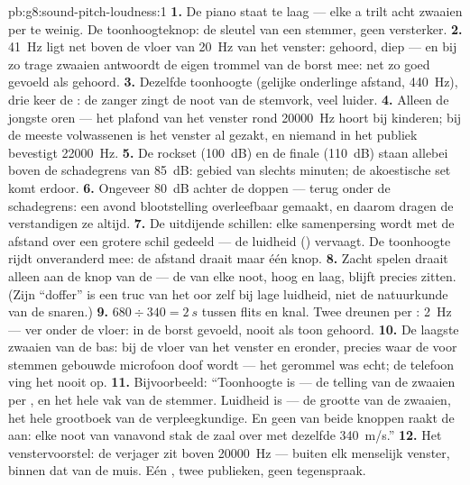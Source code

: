 \begin{solution}{pb:g8:sound-pitch-loudness:1}
\textbf{1.} De piano staat te laag --- elke a trilt acht zwaaien per
 te weinig. De toonhoogteknop: de sleutel van een stemmer, geen
versterker.
\textbf{2.} \qty{41}{Hz} ligt net boven de vloer van \qty{20}{Hz} van
het venster: gehoord, diep --- en bij zo trage zwaaien antwoordt de
eigen trommel van de borst mee: net zo goed gevoeld als gehoord.
\textbf{3.} Dezelfde toonhoogte (gelijke onderlinge afstand,
\qty{440}{Hz}), drie keer de : de zanger zingt de noot
van de stemvork, veel luider.
\textbf{4.} Alleen de jongste oren --- het plafond van het venster rond
\qty{20000}{Hz} hoort bij kinderen; bij de meeste volwassenen is het
venster al gezakt, en niemand in het publiek bevestigt \qty{22000}{Hz}.
\textbf{5.} De rockset (\qty{100}{dB}) en de finale (\qty{110}{dB})
staan allebei boven de schadegrens van \qty{85}{dB}: gebied van slechts
minuten; de akoestische set komt erdoor.
\textbf{6.} Ongeveer \qty{80}{dB} achter de doppen --- terug onder de
schadegrens: een avond blootstelling overleefbaar gemaakt, en daarom
dragen de verstandigen ze altijd.
\textbf{7.} De uitdijende schillen: elke samenpersing wordt met de
afstand over een grotere schil gedeeld --- de luidheid
() vervaagt. De toonhoogte rijdt onveranderd mee: de
afstand draait maar één knop.
\textbf{8.} Zacht spelen draait alleen aan de knop van de
 --- de  van elke noot, hoog en
laag, blijft precies zitten. (Zijn ``doffer'' is een truc van het oor
zelf bij lage luidheid, niet de natuurkunde van de snaren.)
\textbf{9.} $680 \div 340 = \qty{2}{s}$ tussen flits en knal. Twee
dreunen per : \qty{2}{Hz} --- ver onder de vloer: in de borst
gevoeld, nooit als toon gehoord.
\textbf{10.} De laagste zwaaien van de bas: bij de vloer van het venster
en eronder, precies waar de voor stemmen gebouwde microfoon doof wordt
--- het gerommel was echt; de telefoon ving het nooit op.
\textbf{11.} Bijvoorbeeld: ``Toonhoogte is  --- de
telling van de zwaaien per , en het hele vak van de stemmer.
Luidheid is  --- de grootte van de zwaaien, het hele
grootboek van de verpleegkundige. En geen van beide knoppen raakt de
 aan: elke noot van vanavond stak de zaal over met
dezelfde \qty{340}{m/s}.''
\textbf{12.} Het venstervoorstel: de verjager zit boven \qty{20000}{Hz}
--- buiten elk menselijk venster, binnen dat van de muis. Eén ,
twee publieken, geen tegenspraak.
\end{solution}
